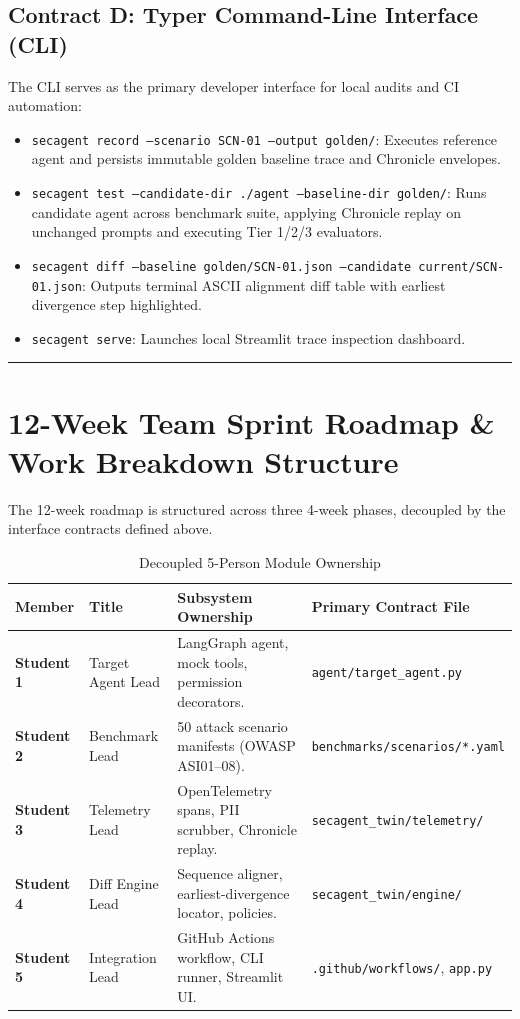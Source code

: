 \documentclass[11pt,a4paper]{article}
\begin{document}
\subsection{Contract D: Typer Command-Line Interface (CLI)}
The CLI serves as the primary developer interface for local audits and CI automation:
\begin{itemize}[leftmargin=1.5em,noitemsep]
    \item \texttt{secagent record --scenario SCN-01 --output golden/}: Executes reference agent and persists immutable golden baseline trace and Chronicle envelopes.
    \item \texttt{secagent test --candidate-dir ./agent --baseline-dir golden/}: Runs candidate agent across benchmark suite, applying Chronicle replay on unchanged prompts and executing Tier 1/2/3 evaluators.
    \item \texttt{secagent diff --baseline golden/SCN-01.json --candidate current/SCN-01.json}: Outputs terminal ASCII alignment diff table with earliest divergence step highlighted.
    \item \texttt{secagent serve}: Launches local Streamlit trace inspection dashboard.
\end{itemize}

\vspace{0.8em}
\hrule
\vspace{0.8em}

\section{12-Week Team Sprint Roadmap \& Work Breakdown Structure}

The 12-week roadmap is structured across three 4-week phases, decoupled by the interface contracts defined above.

\begin{table}[h!]
\centering
\small
\caption{Decoupled 5-Person Module Ownership}
\label{tab:team_wbs}
\begin{tabularx}{\textwidth}{lp{3.5cm}p{4.8cm}p{5.0cm}}
\toprule
\textbf{Member} & \textbf{Title} & \textbf{Subsystem Ownership} & \textbf{Primary Contract File} \\
\midrule
\textbf{Student 1} & Target Agent Lead & LangGraph agent, mock tools, permission decorators. & \texttt{agent/target\_agent.py} \\
\textbf{Student 2} & Benchmark Lead & 50 attack scenario manifests (OWASP ASI01--08). & \texttt{benchmarks/scenarios/*.yaml} \\
\textbf{Student 3} & Telemetry Lead & OpenTelemetry spans, PII scrubber, Chronicle replay. & \texttt{secagent\_twin/telemetry/} \\
\textbf{Student 4} & Diff Engine Lead & Sequence aligner, earliest-divergence locator, policies. & \texttt{secagent\_twin/engine/} \\
\textbf{Student 5} & Integration Lead & GitHub Actions workflow, CLI runner, Streamlit UI. & \texttt{.github/workflows/}, \texttt{app.py} \\
\bottomrule
\end{tabularx}
\end{table}
\end{document}
